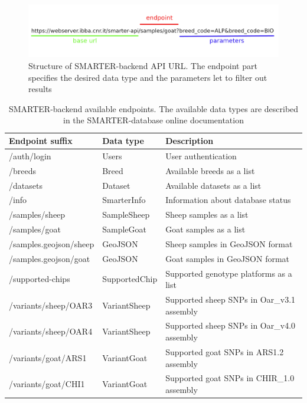 \documentclass[a4paper,num-refs,gigabyte]{oup-contemporary}
\begin{document}
\begin{figure}
\centering
\includegraphics[width=.45\textwidth]{backend_URL.png}
\caption{Structure of SMARTER-backend API URL. The endpoint part specifies the desired data type and the parameters let to filter out results}
\label{fig:backend_url}
\end{figure}

\begin{table}
\caption{SMARTER-backend available endpoints. The available data types are described in the SMARTER-database online documentation\citep{SMARTERdocs}}
\label{tab:endpoints}
\begin{center}
\begin{tabular}{l l l}
\toprule
Endpoint suffix & Data type & Description \\
\midrule
/auth/login & Users & User authentication \\
/breeds & Breed & Available breeds as a list \\
/datasets & Dataset & Available datasets as a list \\
/info & SmarterInfo & Information about database status \\
/samples/sheep & SampleSheep & Sheep samples as a list \\
/samples/goat & SampleGoat & Goat samples as a list \\
/samples.geojson/sheep & GeoJSON & Sheep samples in GeoJSON format \\
/samples.geojson/goat & GeoJSON & Goat samples in GeoJSON format \\
/supported-chips & SupportedChip & Supported genotype platforms as a list \\
/variants/sheep/OAR3 & VariantSheep & Supported sheep SNPs in Oar\_v3.1 assembly \\
/variants/sheep/OAR4 & VariantSheep & Supported sheep SNPs in Oar\_v4.0 assembly \\
/variants/goat/ARS1 & VariantGoat & Supported goat SNPs in ARS1.2 assembly \\
/variants/goat/CHI1 & VariantGoat & Supported goat SNPs in CHIR\_1.0 assembly \\
\bottomrule
\end{tabular}
\end{center}
\end{table}
\end{document}
